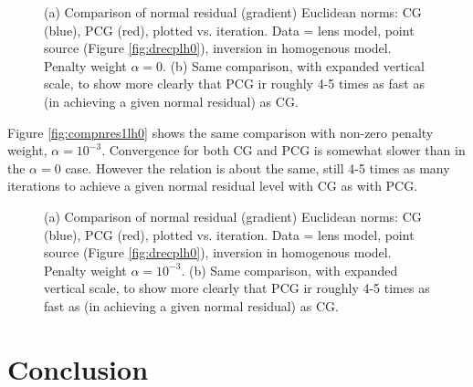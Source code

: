 \documentclass[georeport,12pt]{geophysics}
\begin{document}

\begin{figure}
  \centering
  \caption{(a) Comparison of normal residual 
  (gradient) Euclidean norms: CG (blue), PCG (red), plotted 
  vs. iteration. Data = lens model, point source (Figure 
  \ref{fig:drecplh0}), inversion in homogenous model. Penalty weight 
  $\alpha=0$. (b) Same comparison, with expanded vertical scale, to
  show more clearly that PCG ir roughly 4-5 times as fast as (in
  achieving a given normal residual) as CG.}
\end{figure}

Figure \ref{fig:compnres1lh0} shows the same comparison with non-zero
penalty weight, $\alpha=10^{-3}$. Convergence for both CG and PCG is
somewhat slower than in the $\alpha=0$ case. However the relation is
about the same, still 4-5 times as many iterations to achieve a given
normal residual level with CG as with PCG.

\begin{figure}
  \centering
  \caption{(a) Comparison of normal residual 
  (gradient) Euclidean norms: CG (blue), PCG (red), plotted 
  vs. iteration. Data = lens model, point source (Figure 
  \ref{fig:drecplh0}), inversion in homogenous model. Penalty weight 
  $\alpha=10^{-3}$. (b) Same comparison, with expanded vertical scale, to
  show more clearly that PCG ir roughly 4-5 times as fast as (in
  achieving a given normal residual) as CG.}
\end{figure}




\section{Conclusion}
\end{document}
